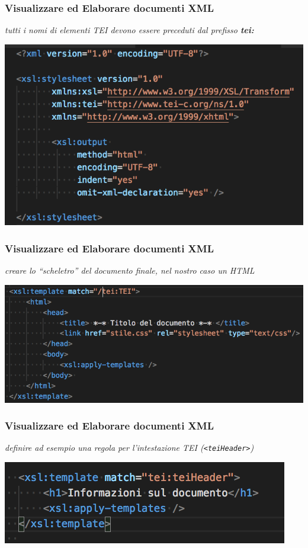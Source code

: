 \begin{frame}
    \frametitle{Visualizzare ed Elaborare documenti XML}
    \addtocounter{nframe}{1}
    
        \textit{tutti i nomi di elementi TEI devono essere preceduti dal
        prefisso \textbf{tei:}}

    \begin{center}
        \includegraphics[width=.8\textwidth]{imgs/EsempioCommentato1.png}
    \end{center}

\end{frame}


\begin{frame}
    \frametitle{Visualizzare ed Elaborare documenti XML}
    \addtocounter{nframe}{1}
    
        \textit{creare lo “scheletro” del documento finale, nel nostro caso un HTML}

    \begin{center}
        \includegraphics[width=.8\textwidth]{imgs/EsempioCommentato2.png}
    \end{center}

\end{frame}

\begin{frame}
    \frametitle{Visualizzare ed Elaborare documenti XML}
    \addtocounter{nframe}{1}
    
        \textit{definire ad esempio una regola per l’intestazione TEI (\texttt{<teiHeader>})}

    \begin{center}
        \includegraphics[width=.8\textwidth]{imgs/EsempioCommentato3.png}
    \end{center}

\end{frame}


